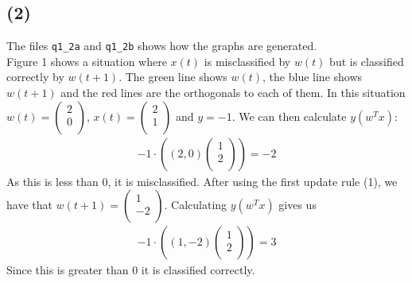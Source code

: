 \documentclass[a4paper]{article}
\begin{document}
\subsection*{(2)}
The files \texttt{q1\_2a} and \texttt{q1\_2b} shows how the graphs are generated.\\
Figure 1 shows a situation where $x(t)$ is misclassified by $w(t)$ but is classified correctly by $w(t+1)$. The green line shows $w(t)$, the blue line shows $w(t+1)$ and the red lines are the orthogonals to each of them. In this situation 
$w(t)=\left(
\begin{array}{c}
2\\
0\\
\end{array}
\right)$, $x(t)=\left(
\begin{array}{c}
2\\
1\\
\end{array}
\right)$ and $y=-1$. We can then calculate $y(w^Tx)$:
\begin{align*}
-1\cdot \left((2,0)\left(\begin{array}{c}
1\\
2\\
\end{array}\right)\right)=-2
\end{align*}
As this is less than $0$, it is misclassified. After using the first update rule (1), we have that $w(t+1)=\left(
\begin{array}{c}
1\\
-2\\
\end{array}
\right)$. Calculating $y(w^Tx)$ gives us
\begin{align*}
-1\cdot \left((1,-2)\left(\begin{array}{c}
1\\
2\\
\end{array}\right)\right)=3
\end{align*}
Since this is greater than $0$ it is classified correctly.\\
\\
\end{document}
